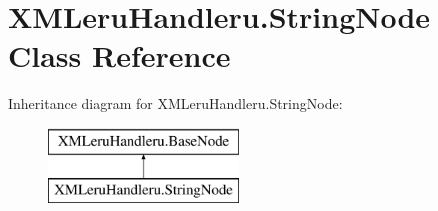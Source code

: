 \hypertarget{class_x_m_leru_handleru_1_1_string_node}{}\section{X\+M\+Leru\+Handleru.\+String\+Node Class Reference}
\label{class_x_m_leru_handleru_1_1_string_node}
Inheritance diagram for X\+M\+Leru\+Handleru.\+String\+Node\+:\begin{figure}[H]
\begin{center}
\leavevmode
\includegraphics[height=2.000000cm]{class_x_m_leru_handleru_1_1_string_node}
\end{center}
\end{figure}
